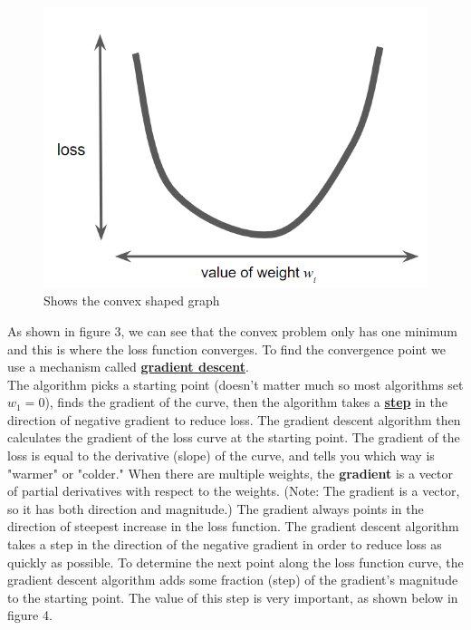 \documentclass[12pt]{article}
\begin{document}
\begin{figure}[ht]
\centering
\includegraphics[scale = 0.7]{imgs/lossVSweight}
\caption{Shows the convex shaped graph}
\end{figure}

As shown in figure 3, we can see that the convex problem only has one minimum and this is where the loss function converges. To find the convergence point we use a mechanism called \href{https://developers.google.com/machine-learning/glossary#gradient_descent}{\textbf{gradient descent}}.
\\The algorithm picks a starting point (doesn't matter much so most algorithms set $w_1 = 0$), finds the gradient of the curve, then the algorithm takes a \href{https://developers.google.com/machine-learning/glossary#step}{\textbf{step}} in the direction of negative gradient to reduce loss. The gradient descent algorithm then calculates the gradient of the loss curve at the starting point. The gradient of the loss is equal to the derivative (slope) of the curve, and tells you which way is "warmer" or "colder." When there are multiple weights, the \textbf{gradient} is a vector of partial derivatives with respect to the weights. (Note: The gradient is a vector, so it has both direction and magnitude.) The gradient always points in the direction of steepest increase in the loss function. The gradient descent algorithm takes a step in the direction of the negative gradient in order to reduce loss as quickly as possible. To determine the next point along the loss function curve, the gradient descent algorithm adds some fraction (step) of the gradient's magnitude to the starting point. The value of this step is very important, as shown below in figure 4.
\end{document}
